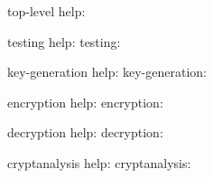top-level help:
\codes{}
\bigskip

testing help:
\codes{}
\bigskip
testing:
\codes{}
\bigskip

key-generation help:
\codes{}
\bigskip
key-generation:
\codes{}
\bigskip

encryption help:
\codes{}
\bigskip
encryption:
\codes{}
\bigskip

decryption help:
\codes{}
\bigskip
decryption:
\codes{}
\bigskip

cryptanalysis help:
\codes{}
\bigskip
cryptanalysis:
\codes{}
\bigskip
